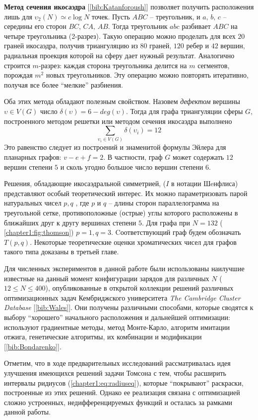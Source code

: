 \textbf{Метод сечения икосаэдра} [\ref{bib:Katanforoush}] позволяет получить расположения лишь 
для $\upsilon_2(N) \simeq c\log{}N$ точек. 
Пусть $ABC$ -- треугольник, и $a,\,b,\,c$ -- середины его сторон $BC,\,CA,\,AB$. 
Тогда треугольник $abc$ разбивает $ABC$ на четыре треугольника (2-разрез). 
Такую операцию можно проделать для всех $20$ граней икосаэдра, 
получив триангуляцию из $80$ граней, $120$ ребер и $42$ вершин, радиальная проекция которой на сферу дает нужный результат. 
Аналогично строится $m$-разрез: каждая сторона треугольника делится на $m$ сегментов, порождая $m^2$ новых треугольников.
Эту операцию можно повторять итеративно, получая все более \enquote{мелкие} разбиения. 

Оба этих метода обладают полезным свойством. Назовем \textit{дефектом} вершины $\upsilon \in V(G)$ 
число $\delta(\upsilon) = 6 - deg(\upsilon)$. 
Тогда для графа триангуляции сферы $G$, построенного методом решетки или методом сечения икосаэдра выполнено 
\begin{equation}\label{chapter1:eq:defect}
\sum\limits_{\upsilon_i \in V(G)} \delta(\upsilon_i) = 12
\end{equation}
Это равенство следует из построений и знаменитой формулы Эйлера для планарных графов: 
$v - e + f = 2$.
В частности, граф $G$ может содержать $12$ вершин степени $5$ и сколь угодно большое число вершин степени $6$. 

Решения, обладающие икосаэдральной симметрией, ($I$ в нотации Шeнфлиса) представляют особый теоретический интерес.
Их можно параметризовать парой натуральных чисел $p,q$ , где $p$ и $q$ -- длины сторон параллелограмма на треугольной сетке, 
противоположные (острые) углы которого расположены в ближайших друг к другу вершинах степени $5$. 
Для графа при $N=132$ (\figurename{ \ref{chapter1:fig:thomson}}) $p=1,q=3$.
Cоответствующий граф будем обозначать $T(p,q)$. 
Некоторые теоретические оценки хроматических чисел для графов такого типа доказаны в третьей главе.

Для численных экспериментов в данной работе были использованы наилучшие 
известные на данный момент конфигурации зарядов для различных $N$ ($12 \le N \le 400$), опубликованные 
в открытой коллекции решений различных оптимизационных задач Кембриджского университета
\textit{The Cambridge Cluster Database} [\ref{bib:Wales}]. 
Они получены различными способами, которые сводятся к выбору \enquote{хорошего} начального расположения
и дальнейшей оптимизации: 
используют градиентные методы, метод Монте-Карло, алгоритм имитации отжига, 
генетические алгоритмы, их комбинации и модификации [\ref{bib:Bondarenko}].

Отметим, что в ходе предварительных исследований рассматривалась идея улучшения имеющихся решений задачи Томсона
с тем, чтобы расширить интервалы ридиусов (\ref{chapter1:eq:radiuseq}), которые \enquote{покрывают} раскраски, 
построенные из этих решений. Однако ее реализация связана с оптимизацией сложно устроенных, 
недифференцируемых функций и осталась за рамками данной работы.
